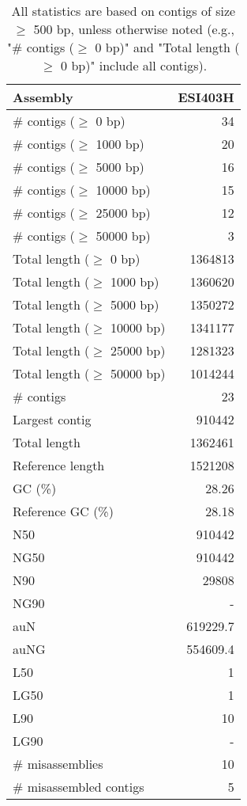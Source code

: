 \documentclass[12pt,a4paper]{article}
\begin{document}
\begin{table}[ht]
\begin{center}
\caption{All statistics are based on contigs of size $\geq$ 500 bp, unless otherwise noted (e.g., "\# contigs ($\geq$ 0 bp)" and "Total length ($\geq$ 0 bp)" include all contigs).}
\begin{tabular}{|l*{1}{|r}|}
\hline
Assembly & ESI403H \\ \hline
\# contigs ($\geq$ 0 bp) & 34 \\ \hline
\# contigs ($\geq$ 1000 bp) & 20 \\ \hline
\# contigs ($\geq$ 5000 bp) & 16 \\ \hline
\# contigs ($\geq$ 10000 bp) & 15 \\ \hline
\# contigs ($\geq$ 25000 bp) & 12 \\ \hline
\# contigs ($\geq$ 50000 bp) & 3 \\ \hline
Total length ($\geq$ 0 bp) & 1364813 \\ \hline
Total length ($\geq$ 1000 bp) & 1360620 \\ \hline
Total length ($\geq$ 5000 bp) & 1350272 \\ \hline
Total length ($\geq$ 10000 bp) & 1341177 \\ \hline
Total length ($\geq$ 25000 bp) & 1281323 \\ \hline
Total length ($\geq$ 50000 bp) & 1014244 \\ \hline
\# contigs & 23 \\ \hline
Largest contig & 910442 \\ \hline
Total length & 1362461 \\ \hline
Reference length & 1521208 \\ \hline
GC (\%) & 28.26 \\ \hline
Reference GC (\%) & 28.18 \\ \hline
N50 & 910442 \\ \hline
NG50 & 910442 \\ \hline
N90 & 29808 \\ \hline
NG90 & - \\ \hline
auN & 619229.7 \\ \hline
auNG & 554609.4 \\ \hline
L50 & 1 \\ \hline
LG50 & 1 \\ \hline
L90 & 10 \\ \hline
LG90 & - \\ \hline
\# misassemblies & 10 \\ \hline
\# misassembled contigs & 5 \\ \hline

\end{tabular}
\end{center}
\end{table}
\end{document}
